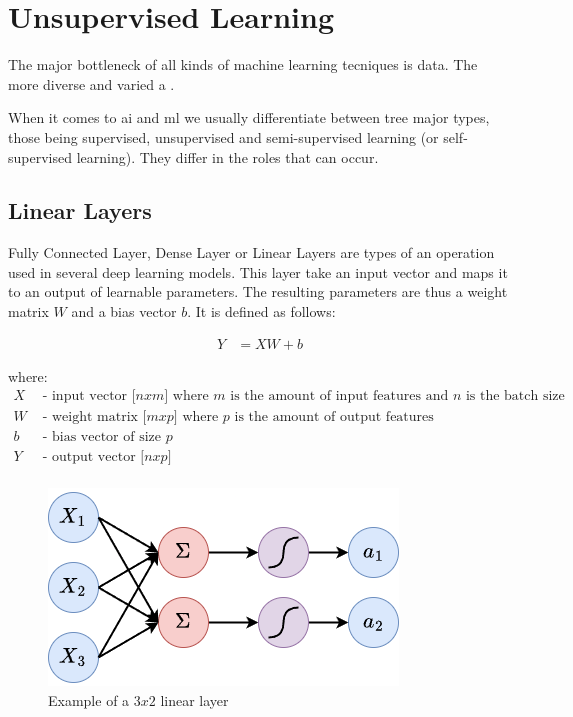 \section{Unsupervised Learning}

The major bottleneck of all kinds of machine learning tecniques is data. The more diverse and varied a .

When it comes to \acrshort{ai} and \acrshort{ml} we usually differentiate between tree major types, those being supervised, unsupervised and semi-supervised learning (or self-supervised learning). They differ in the roles that can occur.


\subsection{Linear Layers}
\label{back:linear}

Fully Connected Layer, Dense Layer or Linear Layers  are types of an operation used in several deep learning models. This layer take an input vector and maps it to an output of learnable parameters. The resulting parameters are thus a weight matrix $W$ and a bias vector $b$. It is defined as follows:

\begin{align}
    Y &= XW + b
\end{align}

where:
\begin{align*}
    X & \text{ - input vector [$n x m$] where $m$ is the amount of input features and $n$ is the batch size} \\
    W & \text{ - weight matrix [$m x p$] where $p$ is the amount of output features} \\
    b & \text{ - bias vector of size $p$} \\
    Y & \text{ - output vector [$n x p$]} \\
\end{align*}

\begin{figure}[h]
    \centering
    \includegraphics[width=0.5\linewidth]{figures/linearlayer.png}
    \caption{Example of a $3x2$ linear layer}
    \label{fig:linearlayer}
\end{figure}

